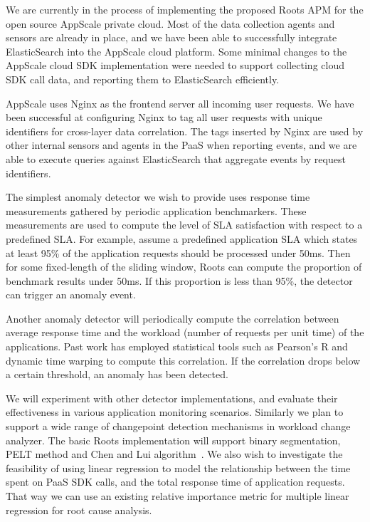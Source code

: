 We are currently in the process of implementing the proposed Roots APM for the open
source AppScale private cloud. Most of the data collection agents and sensors are already
in place, and we have been able to successfully integrate ElasticSearch into
the AppScale cloud platform. Some minimal changes to the AppScale cloud SDK implementation were needed to
support collecting cloud SDK call data, and reporting them to ElasticSearch efficiently.

AppScale uses Nginx as the frontend server all incoming user requests. We have been
successful at configuring Nginx to tag all user requests with unique identifiers for cross-layer
data correlation. The tags inserted by Nginx are used by other internal sensors and agents 
in the PaaS when reporting events, and we are able to execute queries against ElasticSearch
that aggregate events by request identifiers.
 
The simplest anomaly detector we wish to provide uses response time measurements gathered by periodic
application benchmarkers. These measurements are used to compute the level of SLA satisfaction
with respect to a predefined SLA. For example, assume a predefined application SLA which states
at least 95\% of the application requests should be processed under 50ms. Then for some fixed-length
of the sliding window, Roots can compute the proportion of benchmark results under 50ms. If this
proportion is less than 95\%, the detector can trigger an anomaly event.

Another anomaly detector will periodically compute the correlation between average response time and
the workload (number of requests per unit time) of the applications. Past work has employed
statistical tools such as Pearson's R and dynamic time warping to compute this correlation.
If the correlation drops below a certain threshold, an anomaly has been detected.

We will experiment with other detector implementations, and evaluate their effectiveness
in various application monitoring scenarios. Similarly we plan to support a wide range
of changepoint detection mechanisms in workload change analyzer. The basic Roots implementation
will support binary segmentation, PELT method and Chen and Lui algorithm~\cite{killick2012optimal, cl93}. 
We also wish
to investigate the feasibility of using linear regression to model the relationship 
between the time spent on PaaS SDK calls, and the total response time of application
requests. That way we can use an existing relative importance metric for multiple
linear regression for root cause analysis.

